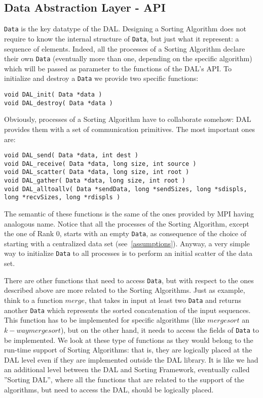 \subsection*{Data Abstraction Layer - API}
\texttt{Data} is the key datatype of the DAL. Designing a Sorting Algorithm does not require to know the internal structure of \texttt{Data}, but just what it represent: a sequence of elements. Indeed, all the processes of a Sorting Algorithm declare their own \texttt{Data} (eventually more than one, depending on the specific algorithm) which will be passed as parameter to the functions of the DAL's API. To initialize and destroy a \texttt{Data} we provide two specific functions:
\begin{lstlisting}
void DAL_init( Data *data )
void DAL_destroy( Data *data )
\end{lstlisting}
Obviously, processes of a Sorting Algorithm have to collaborate somehow: DAL provides them with a set of communication primitives. The most important ones are:
\begin{lstlisting}
void DAL_send( Data *data, int dest )
void DAL_receive( Data *data, long size, int source )
void DAL_scatter( Data *data, long size, int root )
void DAL_gather( Data *data, long size, int root )
void DAL_alltoallv( Data *sendData, long *sendSizes, long *sdispls, long *recvSizes, long *rdispls )
\end{lstlisting}
The semantic of these functions is the same of the ones provided by MPI having analogous name. Notice that all the processes of the Sorting Algorithm, except the one of Rank $0$, starts with an empty \texttt{Data}, as consequence of the choice of starting with a centralized data set (see~\ref{assumptions}). Anyway, a very simple way to initialize \texttt{Data} to all processes is to perform an initial scatter of the data set.

There are other functions that need to access \texttt{Data}, but with respect to the ones described above are more related to the Sorting Algorithms.  Just as example, think to a function $merge$, that takes in input at least two \texttt{Data} and returns another \texttt{Data} which represents the sorted concatenation of the input sequences. This function has to be implemented for specific algorithms (like $mergesort$ an $k-way mergesort$), but on the other hand, it needs to access the fields of \texttt{Data} to be implemented. We look at these type of functions as they would belong to the run-time support of Sorting Algorithms: that is, they are logically placed at the DAL level even if they are implemented outside the DAL library. It is like we had an additional level between the DAL and Sorting Framework, eventually called ''Sorting DAL'', where all the functions that are related to the support of the algorithms, but need to access the DAL, should be logically placed. 

